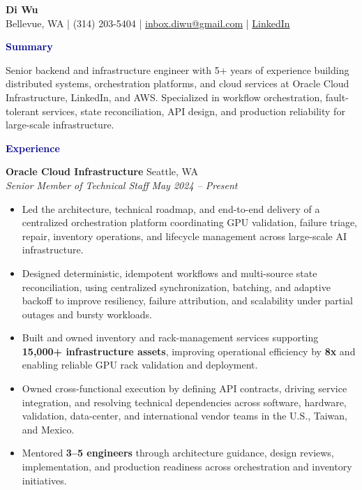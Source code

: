\documentclass[letterpaper,10pt]{article}
\newcommand{\sectionheader}[1]{%
  \vspace{0.45em}
  \noindent\textbf{\textcolor{darkblue}{#1}}\hspace{0.5em}\hrulefill
  \vspace{0.25em}
}
\newcommand{\jobentry}[4]{%
  \textbf{#1} \hfill #2\\[-0.15em]
  \textit{#3} \hfill \textit{#4}
}
\begin{document}
\begin{center}
  \vspace*{-1.25em}
  {\Large\textbf{Di Wu}}\\[-0.05em]
  Bellevue, WA \;|\; (314) 203-5404 \;|\;
  \href{mailto:inbox.diwu@gmail.com}{inbox.diwu@gmail.com} \;|\;
  \href{https://www.linkedin.com/in/di-wu-2020/}{LinkedIn}
\end{center}

\vspace{-0.65em}
\sectionheader{Summary}

Senior backend and infrastructure engineer with 5+ years of experience building distributed systems, orchestration platforms, and cloud services at Oracle Cloud Infrastructure, LinkedIn, and AWS. Specialized in workflow orchestration, fault-tolerant services, state reconciliation, API design, and production reliability for large-scale infrastructure.

\sectionheader{Experience}

\jobentry{Oracle Cloud Infrastructure}{Seattle, WA}{Senior Member of Technical Staff}{May 2024 -- Present}
\begin{itemize}
  \item Led the architecture, technical roadmap, and end-to-end delivery of a centralized orchestration platform coordinating GPU validation, failure triage, repair, inventory operations, and lifecycle management across large-scale AI infrastructure.
  \item Designed deterministic, idempotent workflows and multi-source state reconciliation, using centralized synchronization, batching, and adaptive backoff to improve resiliency, failure attribution, and scalability under partial outages and bursty workloads.
  \item Built and owned inventory and rack-management services supporting \textbf{15,000+ infrastructure assets}, improving operational efficiency by \textbf{8x} and enabling reliable GPU rack validation and deployment.
  \item Owned cross-functional execution by defining API contracts, driving service integration, and resolving technical dependencies across software, hardware, validation, data-center, and international vendor teams in the U.S., Taiwan, and Mexico.
  \item Mentored \textbf{3--5 engineers} through architecture guidance, design reviews, implementation, and production readiness across orchestration and inventory initiatives.
\end{itemize}
\end{document}
